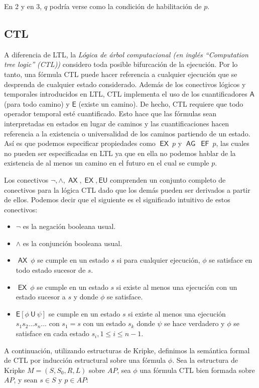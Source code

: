 \documentclass[titlepage, 12pt]{book}
\newcommand{\U}{\mathbin{\textsf{U}}}
\newcommand{\A}{\mathbin{\textsf{A}}}
\newcommand{\E}{\mathbin{\textsf{E}}}
\newcommand{\AX}{\mathop{\mathsf{AX}}}
\newcommand{\AG}{\mathop{\mathsf{AG}}}
\newcommand{\EX}{\mathop{\mathsf{EX}}}
\newcommand{\EF}{\mathop{\mathsf{EF}}}
\begin{document}
En 2 y en 3, $q$ podr\'ia verse como la condici\'on de habilitaci\'on de $p$.

\subsection*{CTL}
A diferencia de LTL, la \textit{L\'ogica de \'arbol computacional (en ingl\'es ``Computation tree logic'' (CTL))} considero toda posible bifurcaci\'on de la ejecuci\'on. Por lo tanto, una f\'ormula CTL puede hacer referencia a cualquier ejecuci\'on que se desprenda de cualquier estado considerado. Adem\'as de los conectivos l\'ogicos y temporales introducidos en LTL, CTL implementa el uso de los cuantificadores $\A$ (para todo camino) y $\E$ (existe un camino). De hecho, CTL requiere que todo operador temporal est\'e cuantificado. Esto hace que las f\'ormulas sean interpretadas en estados en lugar de caminos y las cuantificaciones hacen referencia a la existencia o universalidad de los caminos partiendo de un estado. As\'i es que podemos especificar propiedades como  $\EX~p$ y $\AG~\EF~p$, las cuales no pueden ser especificadas en LTL ya que en ella no podemos hablar de la existencia de al menos un camino en el futuro en el cual se cumple $p$.

Los conectivos ${\neg,\wedge,\AX,\EX,\E\U}$ comprenden un conjunto completo de conectivos para la l\'ogica CTL dado que los dem\'as pueden ser derivados a partir de ellos. Podemos decir que el siguiente es el significado intuitivo de estos conectivos:

\begin{itemize}
\item $\neg$ es la negaci\'on booleana usual.
\item $\wedge$ es la conjunci\'on booleana usual.
\item $\AX~\phi$ se cumple en un estado $s$ si para cualquier ejecuci\'on, $\phi$ se satisface en todo estado sucesor de $s$.
\item $\EX~\phi $ se cumple en un estado $s$ si existe al menos una ejecuci\'on con un estado sucesor a $s$ y donde $\phi$ se satisface.
\item $\E[\phi~\U~\psi]$ se cumple en un estado $s$ si existe al menos una ejecuci\'on $s_1s_2...s_n...$ con $s_1 = s$ con un estado $s_k$ donde $\psi$ se hace verdadero y $\phi$ se satisface en cada estado $s_i, 1 \leq i \leq n-1$.
\end{itemize}

A continuaci\'on, utilizando estructuras de Kripke, definimos la sem\'antica formal de CTL por inducci\'on estructural sobre una f\'ormula $\phi$. Sea la estructura de Kripke $M =(S,S_0,R,L)$ sobre $AP$, sea $\phi$ una f\'ormula CTL bien formada sobre $AP$, y sean $s \in S$ y $p \in AP$:\\
\end{document}
